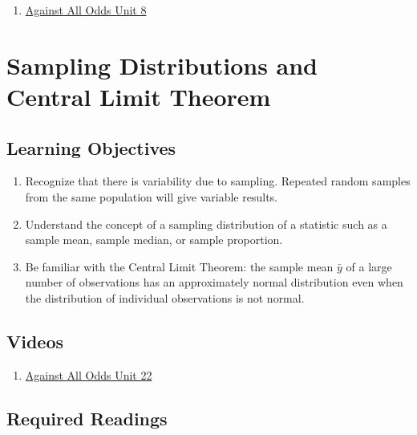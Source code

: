 \documentclass[letterpaper,12pt,twoside,]{pinp}
\providecommand{\tightlist}{%
  \setlength{\itemsep}{0pt}\setlength{\parskip}{0pt}}
\begin{document}
\begin{enumerate}
\item \href{https://www.learner.org/wp-content/uploads/2019/03/AgainstAllOdds_StudentGuide_Unit08-Normal-Calculations.pdf}{Against All Odds Unit 8}
\end{enumerate}

\vspace*{0.25cm}

\hypertarget{sampling-distributions-and-central-limit-theorem}{%
\section{Sampling Distributions and Central Limit
Theorem}\label{sampling-distributions-and-central-limit-theorem}}

\hypertarget{learning-objectives-2}{%
\subsection{Learning Objectives}\label{learning-objectives-2}}

\begin{enumerate}
\def\labelenumi{\arabic{enumi}.}
\tightlist
\item
  Recognize that there is variability due to sampling. Repeated random
  samples from the same population will give variable results.
\item
  Understand the concept of a sampling distribution of a statistic such
  as a sample mean, sample median, or sample proportion.
\item
  Be familiar with the Central Limit Theorem: the sample mean
  \(\bar{y}\) of a large number of observations has an approximately
  normal distribution even when the distribution of individual
  observations is not normal.
\end{enumerate}

\hypertarget{videos-1}{%
\subsection{Videos}\label{videos-1}}

\begin{enumerate}
\def\labelenumi{\arabic{enumi}.}
\tightlist
\item
  \href{https://www.learner.org/series/against-all-odds-inside-statistics/sampling-distributions/}{Against
  All Odds Unit 22}
\end{enumerate}

\hypertarget{required-readings-2}{%
\subsection{Required Readings}\label{required-readings-2}}
\end{document}
